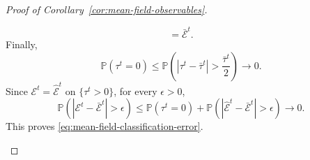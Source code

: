 \begin{proof}[Proof of Corollary~\ref{cor:mean-field-observables}]
\begin{enumerate}[wide]
\[        =
        \bar{\mathcal E}^t.
    \]
    Finally,
    \[
        \mathbb P(\tau^t=0)
        \leq
        \mathbb P\left(
            |\tau^t-\bar\tau^t|>\frac{\bar\tau^t}{2}
        \right)
        \longrightarrow0.
    \]
    Since $\mathcal E^t=\widehat{\mathcal E}^t$
    on $\{\tau^t>0\}$, for every $\epsilon>0$,
    \[
        \mathbb P\left(
            |\mathcal E^t-\bar{\mathcal E}^t|>\epsilon
        \right)
        \leq
        \mathbb P(\tau^t=0)
        +
        \mathbb P\left(
            |\widehat{\mathcal E}^t-\bar{\mathcal E}^t|
            >\epsilon
        \right)
        \longrightarrow0.
    \]
    This proves \eqref{eq:mean-field-classification-error}.
\end{enumerate}
\end{proof}
